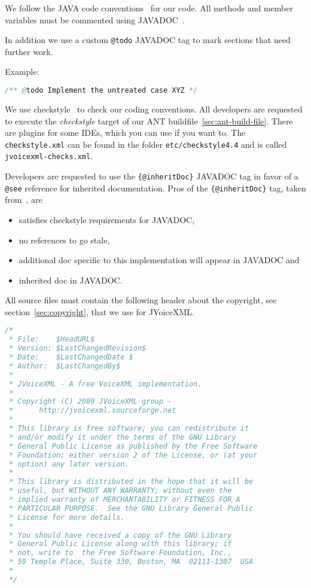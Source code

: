 \documentclass[11pt,a4paper]{article}
\begin{document}
We follow the JAVA code conventions~\cite{sun:codeconv} for our code. All
methods and member variables must be commented using 
JAVADOC~\cite{sun:javadoc_guidelines}.

In addition we use a custom \texttt{@todo} JAVADOC tag to mark
sections that need further work.

Example:

\begin{lstlisting}[language=Java]
/** @todo Implement the untreated case XYZ */
\end{lstlisting}

We use checkstyle~\cite{checkstyle} to check our coding conventions.
All developers are requested to execute the \emph{checkstyle} target
of our ANT buildfile~\ref{sec:ant-build-file}. 
There are plugins for some IDEs, which you can use if you want to. The
\texttt{checkstyle.xml} can be found in the folder 
\texttt{etc/checkstyle4.4} and is called \texttt{jvoicexml-checks.xml}.

Developers are requested to use the \texttt{\{@inheritDoc\}} JAVADOC
tag in favor of a \texttt{@see} reference for inherited documentation.
Pros of the \texttt{\{@inhe\-rit\-Doc\}} tag, taken 
from~\cite{tauber:inheritdoc}, are
\begin{itemize}
\item satisfies checkstyle requirements for JAVADOC,
\item no references to go stale,
\item additional doc specific to this implementation will appear in JAVADOC and
\item inherited doc in JAVADOC.
\end{itemize}

All source files must contain the following header about the 
copyright, see section~\ref{sec:copyright}, that we use for JVoiceXML.

\begin{lstlisting}[language=Java]
/*
 * File:    $HeadURL$
 * Version: $LastChangedRevision$
 * Date:    $LastChangedDate $
 * Author:  $LastChangedBy$
 *
 * JVoiceXML - A free VoiceXML implementation.
 *
 * Copyright (C) 2009 JVoiceXML group - 
 *      http://jvoicexml.sourceforge.net
 *
 * This library is free software; you can redistribute it 
 * and/or modify it under the terms of the GNU Library 
 * General Public License as published by the Free Software 
 * Foundation; either version 2 of the License, or (at your 
 * option) any later version.
 *
 * This library is distributed in the hope that it will be 
 * useful, but WITHOUT ANY WARRANTY; without even the 
 * implied warranty of MERCHANTABILITY or FITNESS FOR A 
 * PARTICULAR PURPOSE.  See the GNU Library General Public 
 * License for more details.
 *
 * You should have received a copy of the GNU Library 
 * General Public License along with this library; if 
 * not, write to  the Free Software Foundation, Inc., 
 * 59 Temple Place, Suite 330, Boston, MA  02111-1307  USA
 *
 */
\end{lstlisting}
\end{document}
